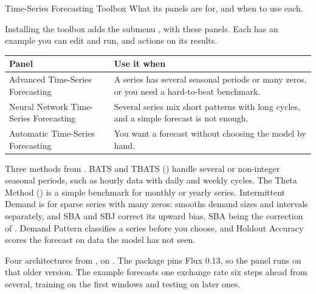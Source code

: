 
\renewcommand{\vignetteauthor}{Pollis}
\renewcommand{\vignettedate}{17 November 2026}
\renewcommand{\vignettelicense}{AGPL-3.0}



  {Time-Series Forecasting Toolbox}
  {What its panels are for, and when to use each.}

Installing the toolbox adds the submenu , with these panels. Each has an example you can edit and run, and actions on its results.

\medskip
{\small
\begin{tabularx}{\linewidth}{@{}>{\raggedright\arraybackslash}p{62mm}X@{}}
\toprule
\textbf{Panel} & \textbf{Use it when} \\\midrule
Advanced Time-Series Forecasting & A series has several seasonal periods or many zeros, or you need a hard-to-beat benchmark. \\
Neural Network Time-Series Forecasting & Several series mix short patterns with long cycles, and a simple forecast is not enough. \\
Automatic Time-Series Forecasting & You want a forecast without choosing the model by hand. \\\bottomrule
\end{tabularx}}


Three methods from . BATS and TBATS () handle several or non-integer seasonal periods, such as hourly data with daily and weekly cycles. The Theta Method () is a simple benchmark for monthly or yearly series. Intermittent Demand is for sparse series with many zeros:  smooths demand sizes and intervals separately, and SBA and SBJ correct its upward bias, SBA being the correction of . Demand Pattern classifies a series before you choose, and Holdout Accuracy scores the forecast on data the model has not seen.

Four architectures from , on . The package pins Flux 0.13, so the panel runs on that older version. The example forecasts one exchange rate six steps ahead from several, training on the first windows and testing on later ones.

